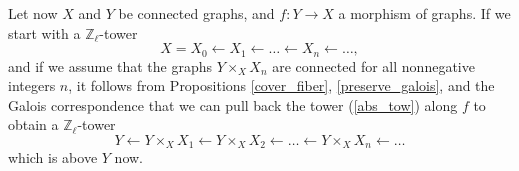 \documentclass[11pt]{amsart}
\numberwithin{equation}{section}
\theoremstyle{remark}
\begin{document}
Let now $X$ and $Y$ be connected graphs, and $f:Y\rightarrow X$ a morphism of graphs.  If we start with a $\mathbb{Z}_{\ell}$-tower
\begin{equation} \label{abs_tow}
X = X_{0} \leftarrow X_{1} \leftarrow \ldots \leftarrow X_{n} \leftarrow \ldots,
\end{equation}
and if we assume that the graphs $Y \times_{X}X_{n}$ are connected for all nonnegative integers $n$, it follows from Propositions \ref{cover_fiber}, \ref{preserve_galois}, and the Galois correspondence that we can pull back the tower (\ref{abs_tow}) along $f$ to obtain a $\mathbb{Z}_{\ell}$-tower
$$Y \leftarrow Y \times_{X}X_{1} \leftarrow Y \times_{X}X_{2} \leftarrow \ldots \leftarrow Y \times_{X}X_{n} \leftarrow \ldots $$
which is above $Y$ now.





\end{document}

